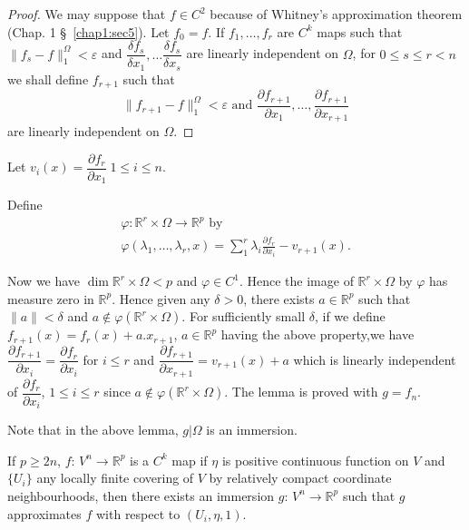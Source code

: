 \begin{proof}
  We may suppose that $f \in C^2$ because of Whitney's approximation
  theorem (Chap. 1 \S\ \ref{chap1:sec5}). Let $f_0=f$. If $f_1, \ldots ,f_r$ are
  $C^k$ maps such that $\parallel f_s-f \parallel^\Omega_1 <
  \varepsilon$ and $\dfrac{\delta f_s}{\delta x_1}, \ldots
  \dfrac{\delta f_s}{\delta x_s}$ are linearly independent on
  $\Omega$, for $0 \leq s \leq r <n$ we shall define $f_{r+1}$ such
  that 
  $$
  \parallel f_{r+1}-f \parallel ^\Omega _1 < \varepsilon \text{ and }
  \frac{\partial f_{r+1} }{\partial x_1} , \ldots, \frac{\partial
    f_{r+1} }{\partial x_{r+1}} 
  $$
  are linearly independent on $\Omega$.
\end{proof}

Let $v_i (x)= \dfrac{\partial f_{r} }{\partial x_1} ~1 \leq i \leq n$.

Define
\begin{gather*}
  \varphi :\mathbb{R}^r \times \Omega \to
  \mathbb{R}^p \text{ by }\\ 
  \varphi (\lambda_1 ,\ldots ,\lambda_r,x)=\sum ^r_1 \lambda_i
  \frac{\partial f_r}{\partial x_i}-v_{r+1} (x). 
\end{gather*}

Now we have $\dim \mathbb{R}^r \times \Omega < p$ and $\varphi \in
C^1$. Hence the image of $\mathbb{R}^r \times \Omega$ by $\varphi$ has
measure zero in $\mathbb{R}^p$. Hence given any $\delta >0$, there
exists $a \in \mathbb{R}^p$ 
such that $\parallel a \parallel <\delta$ and $a \notin \varphi
(\mathbb{R}^r \times \Omega)$. For sufficiently small $\delta$, if we
define $f_{r+1}(x)=f_r(x)+a.x_{r+1}$, $a \in \mathbb{R}^p$ having the
above property,\pageoriginale we have $\dfrac{\partial f_{r+1}}{\partial
  x_i}=\dfrac{\partial f_{r}}{\partial x_i}$ for $i \leq r$ and
$\dfrac{\partial f_{r+1}}{\partial x_{r+1}}=v_{r+1}(x)+a$ which is
linearly independent of $\dfrac{\partial f_{r}}{\partial x_i}$, $1
\leq i \leq r$ since $a \notin \varphi (\mathbb{R}^r \times
\Omega)$. The lemma is proved with $g=f_n$. 

Note that in the above lemma, $g| \Omega$ is an immersion.

\setcounter{theorem}{0}
\begin{theorem}\label{chap2:sec9:thm1}%
  If $p \geq 2n$, $f$: $V^n \to \mathbb{R}^p$ is a $C^k$ map if $\eta$
  is positive continuous function on $V$ and $\{ U_i \}$ any locally
  finite covering of $V$ by relatively compact coordinate
  neighbourhoods, then there exists an immersion $g$: $V^n \to
  \mathbb{R}^p$ such that $g$ approximates $f$ with respect to $(U_i,
  \eta,1)$.
\end{theorem}

